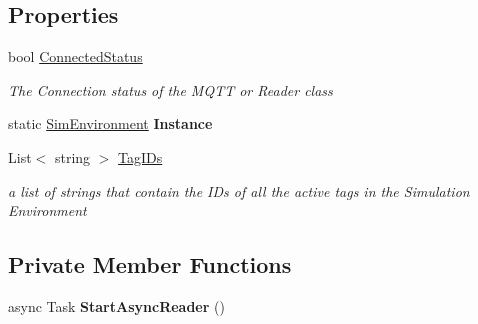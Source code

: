 \subsection*{Properties}
\begin{DoxyCompactItemize}
\item 
bool \hyperlink{class_pozyx_positioner_1_1_framework_1_1_sim_environment_ae0d0d204695b423669bd6d0593d961aa}{Connected\+Status}
\begin{DoxyCompactList}\small\item\em The Connection status of the M\+Q\+TT or Reader class \end{DoxyCompactList}\item 
\mbox{\label{class_pozyx_positioner_1_1_framework_1_1_sim_environment_a099b83d9b2af93ae755b7bd081bef37c}} 
static \hyperlink{class_pozyx_positioner_1_1_framework_1_1_sim_environment}{Sim\+Environment} {\bfseries Instance}
\item 
List$<$ string $>$ \hyperlink{class_pozyx_positioner_1_1_framework_1_1_sim_environment_af1e5db7ec810b6d92216b74c3eeb657a}{Tag\+I\+Ds}
\begin{DoxyCompactList}\small\item\em a list of strings that contain the I\+Ds of all the active tags in the Simulation Environment \end{DoxyCompactList}\end{DoxyCompactItemize}
\subsection*{Private Member Functions}
\begin{DoxyCompactItemize}
\item 
\mbox{\label{class_pozyx_positioner_1_1_framework_1_1_sim_environment_acb84aa7c4c3ea6384dcd651b2d59b120}} 
async Task {\bfseries Start\+Async\+Reader} ()
\end{DoxyCompactItemize}
